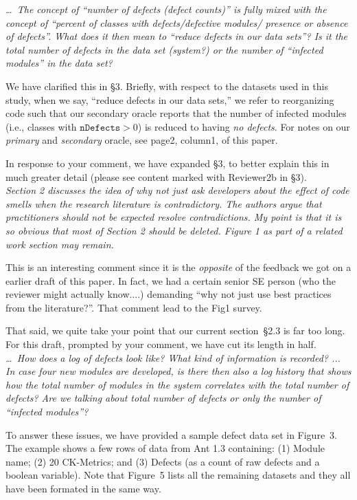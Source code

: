 \documentclass[twocolumn,5p]{elsarticle}
\newcommand{\tion}[1]{\S#1}
\newcommand{\fig}[1]{Figure~#1}
\newcommand{\review}[1]{\noindent\textit{#1\\}}
\theoremstyle{break}
\begin{document}
\review{\ldots~The concept of “number of defects (defect counts)” 
	is fully mixed with the concept of “percent of classes with 
	defects/defective modules/ presence or absence of defects”. What does it 
	then mean to “reduce defects in our data sets”? Is it the total number of 
	defects in the data set (system?) or the number of “infected modules” in 
	the data set?}

We have clarified this in \tion{3}. Briefly, with respect to the 
datasets used in this study, when we say, ``reduce defects in our data 
sets,'' we refer to 
reorganizing code such that our secondary oracle reports
that the number of infected modules (i.e., classes with 
$\texttt{nDefects}>0$) is reduced to having \textit{no defects}.
For notes on our {\em primary} and {\em secondary} oracle, see page2, 
column1, of this paper.

In response to your  comment, we have expanded \tion{3}, to 
better explain this in much greater detail (please see content marked with 
{\color{steel}Reviewer2b} in \tion{3}). \\

\review{ Section 2 discusses the idea of why not just ask developers
	about the effect of code smells when the research literature is
	contradictory. The authors argue that practitioners
	should not be expected resolve contradictions. My point is that it is
	so obvious that most of Section 2 should be deleted. Figure 1 as part
	of a related work section may remain.}

This is an interesting comment since it is the {\em opposite} of the feedback 
we got on a earlier draft of this paper. In fact, we had
a certain senior SE person (who the reviewer might actually know....) demanding 
``why not just use best practices from the literature?''.
That comment lead to the Fig1 survey.


That said, we quite take your point that our current 
section~\tion{2.3} is far 
too long. For this draft, prompted by
your comment, we have cut its length in half.\\

\review{\ldots~How does a log of defects look 
	like? What kind of information is recorded? ...  In case 
	four new modules are developed, is there then also a log 
	history that shows how the total number of modules in the system correlates 
	with the total number of defects? Are we talking about total number of 
	defects or only the number of “infected modules”?}


To answer these issues, we have provided a sample defect data set in 
\fig{3}. The example shows a few rows of data from Ant 1.3 
containing: (1) Module 
name; (2) 20 CK-Metrics; and (3) Defects (as a count of raw defects and a 
boolean variable). Note that \fig{5} lists all the remaining datasets and 
they all have been formated in the same way. \\
\end{document}
